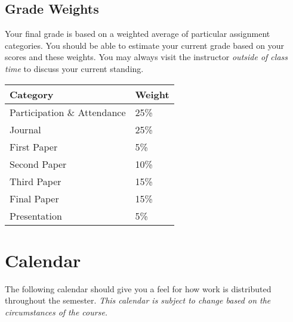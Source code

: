 \documentclass[]{tufte-handout}
\begin{document}
\subsection{Grade Weights}

Your final grade is based on a weighted average of particular assignment categories.  You should be able to estimate your current grade based on your scores and these weights.  You may always visit the instructor \textit{outside of class time} to discuss your current standing.  

\begin{center}
\begin{tabular}{ll}
Category & Weight  \\ \hline
Participation \& Attendance & 25\% \\
Journal & 25\% \\
First Paper & 5\% \\
Second Paper & 10\% \\
Third Paper & 15\% \\
Final Paper & 15\% \\
Presentation & 5\% \\

\end{tabular}
\end{center}


\section{Calendar}

The following calendar should give you a feel for how work is distributed throughout the semester.  \textit{This calendar is subject to change based on the circumstances of the course.}
\end{document}
